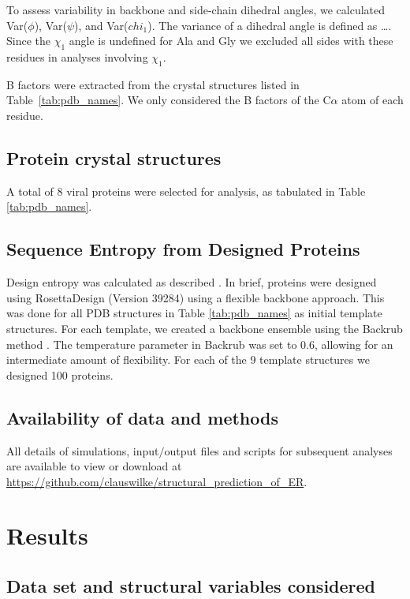 \documentclass[12pt]{article}
\begin{document}
To assess variability in backbone and side-chain dihedral angles, we calculated Var($\phi$), Var($\psi$), and Var($chi_1$). {\color{red}The variance of a dihedral angle is defined as \dots.} Since the $\chi_1$ angle is undefined for Ala and Gly we excluded all sides with these residues in analyses involving $\chi_1$.

B factors were extracted from the crystal structures listed in Table~\ref{tab:pdb_names}. We only considered the B factors of the C$\alpha$ atom of each residue.

\subsection*{Protein crystal structures}
	
A total of $8$ viral proteins were selected for analysis, as tabulated in Table \ref{tab:pdb_names}.

\subsection*{Sequence Entropy from Designed Proteins}

Design entropy was calculated as described \citep{Jacksonetal2013}. In brief, proteins were designed using RosettaDesign (Version 39284) \citep{leaver-fay_rosetta3:_2011} using a flexible backbone approach. This was done for all PDB structures in Table \ref{tab:pdb_names} as initial template structures. For each template, we created a backbone ensemble using the Backrub method \citep{smith_backrub-like_2008}. The temperature parameter in Backrub was set to 0.6, allowing for an intermediate amount of flexibility.  For each of the 9 template structures we designed 100 proteins.

\subsection*{Availability of data and methods}

All details of simulations, input$/$output files and scripts for subsequent analyses are available to view or download at \url{https://github.com/clauswilke/structural\_prediction\_of\_ER}.

\section*{Results}

\subsection*{Data set and structural variables considered}
\end{document}
